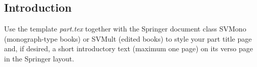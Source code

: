 % 
%
%

\begin{partbacktext}
\part{Introduction}
\noindent Use the template \emph{part.tex} together with the Springer document class SVMono (monograph-type books) or SVMult (edited books) to style your part title page and, if desired, a short introductory text (maximum one page) on its verso page in the Springer layout.

\end{partbacktext}